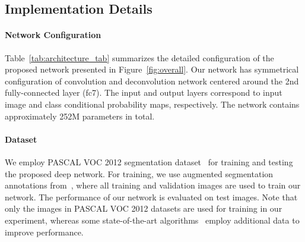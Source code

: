 \documentclass[10pt,twocolumn,letterpaper]{article}
\begin{document}
\subsection{Implementation Details}
\label{sec:impledetail}
\iffalse
{\bf [Dataset]} \\
VOC.
\fi

\paragraph{Network Configuration}
Table~\ref{tab:architecture_tab} summarizes the detailed configuration of the proposed network  presented in Figure~\ref{fig:overall}.
Our network has symmetrical configuration of convolution and deconvolution network centered around the 2nd fully-connected layer (fc7).
The input and output layers correspond to input image and class conditional probability maps, respectively.
The network contains approximately 252M parameters in total.

\paragraph{Dataset}
We employ PASCAL VOC 2012 segmentation dataset~\cite{Pascalvoc} for training and testing the proposed deep network.
For training, we use augmented segmentation annotations from~\cite{Hariharan}, where all training and validation images are used to train our network. 
The performance of our network is evaluated on test images.
Note that only the images in PASCAL VOC 2012 datasets are used for training in our experiment, whereas some state-of-the-art algorithms~\cite{Boxsup, Weaklyandsemi} employ additional data to improve performance.


\iffalse
{\bf [Training stage 1: pre-training] } \\
cropping details (padding). 
class balancing. 
data augmentation. 
segmentation groundtruth-> only centered object. 
\fi
\end{document}

